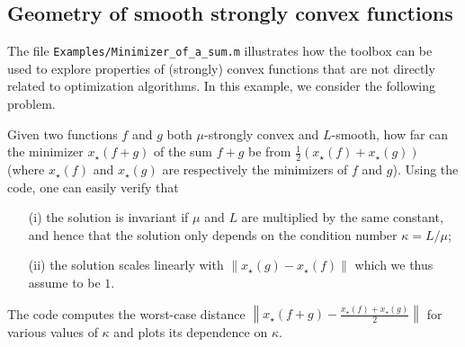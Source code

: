 \documentclass[11pt,a4paper]{article}
\newcommand{\norm}[1]{{\left\lVert#1\right\rVert}}
\begin{document}
\subsection{Geometry of smooth strongly convex functions}
The file \verb?Examples/Minimizer_of_a_sum.m? illustrates how the toolbox can be used to explore properties of (strongly) convex functions that are not directly related to optimization algorithms. In this example, we consider the following problem.

Given two functions $f$ and $g$ both $\mu$-strongly convex and $L$-smooth, how far can the minimizer $x_\star(f+g)$ of the sum $f+g$ be from $\tfrac12 (x_\star(f)+x_\star(g))$ (where $x_\star(f)$ and $x_\star(g)$ are respectively the minimizers of $f$ and $g$). Using the code, one can easily verify that
\begin{itemize}
	\item[(i)] the solution is invariant if $\mu$ and $L$ are multiplied by the same constant, and hence that the solution only depends on the condition number $\kappa = L/\mu$;
	\item[(ii)] the solution scales linearly with $\norm{x_\star(g)-x_\star(f)}$ which we thus assume to be $1$.
\end{itemize}
The code computes the worst-case distance $\norm{x_\star(f+g)-\tfrac{x_\star(f)+x_\star(g)}{2}}$ for various values of $\kappa$ and plots its dependence on $\kappa$.
 
\end{document}
